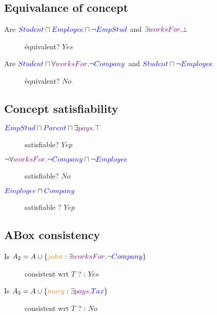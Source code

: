 \subsection{Equivalance of concept}
\begin{description}
\item[Are $\textcolor{blue}{Student} \sqcap \textcolor{blue}{Employee} \sqcap \neg \textcolor{blue}{EmpStud}$ and $\exists \textcolor{violet}{worksFor}.\bot$] équivalent? $Yes$
\item[Are $\textcolor{blue}{Student} \sqcap \forall \textcolor{violet}{worksFor}.\neg \textcolor{blue}{Company}$ and $\textcolor{blue}{Student} \sqcap \neg \textcolor{blue}{Employee}$] équivalent? $No$
\end{description}

\subsection{Concept satisfiability}
\begin{description}
\item[$\textcolor{blue}{EmpStud} \sqcap \textcolor{blue}{Parent} \sqcap \exists \textcolor{violet}{pays}.\top $] satisfiable? $Yep$
\item[$\neg \forall \textcolor{violet}{worksFor}.\neg \textcolor{blue}{Company} \sqcap \neg \textcolor{blue}{Employee} $] satisfiable? $No$
\item[$\textcolor{blue}{Employee} \sqcap \textcolor{blue}{Company} $] satisfiable ? $Yep$
\end{description}

\subsection{ABox consistency}
\begin{description}
\item[Is $A_2 = A \cup \{\textcolor{orange}{john} : \exists \textcolor{violet}{worksFor}.\neg \textcolor{blue}{Company} \} $] consistent wrt $T$ ? : $Yes$
\item[Is $A_3 = A \cup \{\textcolor{orange}{mary} : \exists \textcolor{violet}{pays}.\textcolor{blue}{Tax} \} $] consistent wrt $T$ ? : $No$
\end{description}


